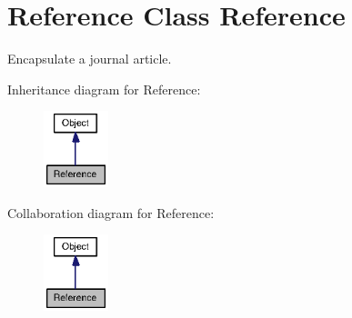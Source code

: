 \hypertarget{class_reference}{
\section{Reference Class Reference}
\label{class_reference}
}
Encapsulate a journal article.  


Inheritance diagram for Reference:\nopagebreak
\begin{figure}[H]
\begin{center}
\leavevmode
\includegraphics[width=53pt]{class_reference__inherit__graph}
\end{center}
\end{figure}
Collaboration diagram for Reference:\nopagebreak
\begin{figure}[H]
\begin{center}
\leavevmode
\includegraphics[width=53pt]{class_reference__coll__graph}
\end{center}
\end{figure}
